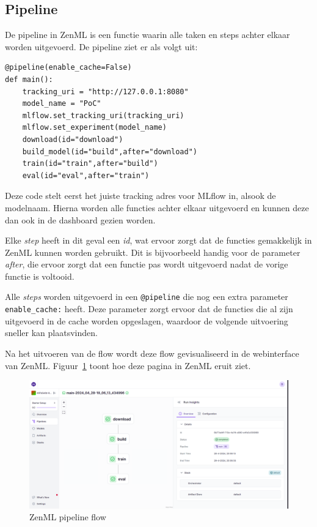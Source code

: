 \subsection{Pipeline}
De pipeline in ZenML is een functie waarin alle taken en steps achter elkaar worden uitgevoerd. De pipeline ziet er als volgt uit:
\begin{verbatim}
@pipeline(enable_cache=False)
def main():
    tracking_uri = "http://127.0.0.1:8080"
    model_name = "PoC"
    mlflow.set_tracking_uri(tracking_uri)
    mlflow.set_experiment(model_name)
    download(id="download")
    build_model(id="build",after="download")
    train(id="train",after="build")
    eval(id="eval",after="train")
\end{verbatim}
Deze code stelt eerst het juiste tracking adres voor MLflow in, alsook de modelnaam. Hierna worden alle functies achter elkaar uitgevoerd en kunnen deze dan ook in de dashboard gezien worden.

Elke \textit{step} heeft in dit geval een \textit{id}, wat ervoor zorgt dat de functies gemakkelijk in ZenML kunnen worden gebruikt. Dit is bijvoorbeeld handig voor de parameter \textit{after}, die ervoor zorgt dat een functie pas wordt uitgevoerd nadat de vorige functie is voltooid.

Alle \textit{steps} worden uitgevoerd in een \texttt{@pipeline} die nog een extra parameter \texttt{enable\_cache:} heeft. Deze parameter zorgt ervoor dat de functies die al zijn uitgevoerd in de cache worden opgeslagen, waardoor de volgende uitvoering sneller kan plaatsvinden.

Na het uitvoeren van de flow wordt deze flow gevisualiseerd in de webinterface van ZenML. Figuur~\ref{fig:ZenML_Pipeline_Flow} toont hoe deze pagina in ZenML eruit ziet.
\begin{figure}[h]
    \centering
    \includegraphics[width=0.9\linewidth]{graphics/ZenML_Pipeline_Flow.PNG}
    \caption{ZenML pipeline flow}
    \label{fig:ZenML_Pipeline_Flow}
\end{figure}

